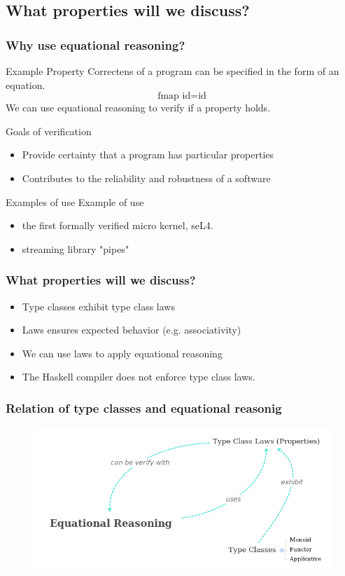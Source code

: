 \documentclass{beamer}
\begin{document}
\subsection{What properties will we discuss?}
\begin{frame}
\frametitle{Why use equational reasoning?}
\begin{block}{Example Property}
Correctens of a program can be specified in the form of an equation.
\begin{equation}
\text{fmap } \text{id}  =  \text{id}  
\end{equation}
We can use equational reasoning to verify if a property holds.  
\end{block}
\begin{block}{Goals of verification}
\begin{itemize}
\item Provide certainty that a program has particular properties
\item Contributes to the reliability and robustness of a software
\end{itemize}  
\end{block}
\begin{block}{Examples of use}
Example of use
\begin{itemize}
\item the first formally verified micro kernel, seL4.
\item streaming library "pipes"
\end{itemize}  
\end{block}
\end{frame}

\begin{frame}
  \frametitle{What properties will we discuss?}
\begin{itemize}
\item Type classes exhibit type class laws
\item Laws ensures expected behavior (e.g. associativity)
\item We can use laws to apply equational reasoning
\item The Haskell compiler does not enforce type class laws.
\end{itemize}

\end{frame}

\begin{frame}
\frametitle{Relation of type classes and equational reasonig}
\begin{figure}
  \centering
     \includegraphics[scale=0.4]{mindmap}
\end{figure}
\end{frame}
\end{document}
